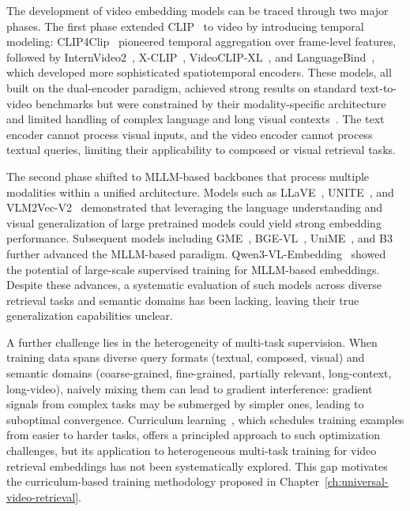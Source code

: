 The development of video embedding models can be traced through two major phases. The first phase extended CLIP~\citep{radford2021learning} to video by introducing temporal modeling: CLIP4Clip~\citep{luo2022clip4clip} pioneered temporal aggregation over frame-level features, followed by InternVideo2~\citep{wang2024internvideo2}, X-CLIP~\citep{gorti2022x}, VideoCLIP-XL~\citep{wang2024videoclip}, and LanguageBind~\citep{zhu2024languagebind}, which developed more sophisticated spatiotemporal encoders. These models, all built on the dual-encoder paradigm, achieved strong results on standard text-to-video benchmarks but were constrained by their modality-specific architecture and limited handling of complex language and long visual contexts~\citep{wang2025internvideo2,li2025improving}. The text encoder cannot process visual inputs, and the video encoder cannot process textual queries, limiting their applicability to composed or visual retrieval tasks.

The second phase shifted to MLLM-based backbones that process multiple modalities within a unified architecture. Models such as LLaVE~\citep{lan2025llave}, UNITE~\citep{kong2025modality}, and VLM2Vec-V2~\citep{meng2025vlm2vec} demonstrated that leveraging the language understanding and visual generalization of large pretrained models could yield strong embedding performance. Subsequent models including GME~\citep{Zhang_2025_CVPR}, BGE-VL~\citep{zhou2024megapairs}, UniME~\citep{gu2025breaking}, and B3~\citep{thirukovalluru2025breaking} further advanced the MLLM-based paradigm. Qwen3-VL-Embedding~\citep{qwen3vlembedding} showed the potential of large-scale supervised training for MLLM-based embeddings. Despite these advances, a systematic evaluation of such models across diverse retrieval tasks and semantic domains has been lacking, leaving their true generalization capabilities unclear.

A further challenge lies in the heterogeneity of multi-task supervision. When training data spans diverse query formats (textual, composed, visual) and semantic domains (coarse-grained, fine-grained, partially relevant, long-context, long-video), naively mixing them can lead to gradient interference: gradient signals from complex tasks may be submerged by simpler ones, leading to suboptimal convergence. Curriculum learning~\citep{bengio2009curriculum}, which schedules training examples from easier to harder tasks, offers a principled approach to such optimization challenges, but its application to heterogeneous multi-task training for video retrieval embeddings has not been systematically explored. This gap motivates the curriculum-based training methodology proposed in Chapter~\ref{ch:universal-video-retrieval}.

